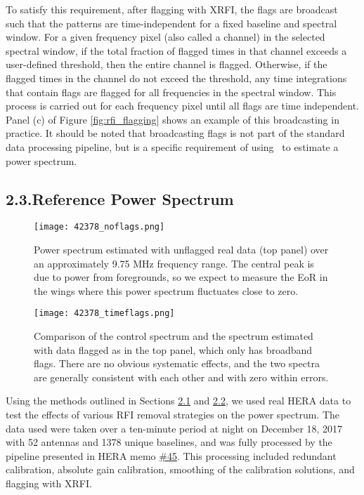 \documentclass[12pt]{article}
\begin{document}
To satisfy this requirement, after flagging with XRFI, the flags are broadcast such that the patterns are time-independent for a fixed baseline and spectral window. For a given frequency pixel (also called a channel) in the selected spectral window, if the total fraction of flagged times in that channel exceeds a user-defined threshold, then the entire channel is flagged. Otherwise, if the flagged times in the channel do not exceed the threshold, any time integrations that contain flags are flagged for all frequencies in the spectral window. This process is carried out for each frequency pixel until all flags are time independent. Panel (c) of Figure \ref{fig:rfi_flagging} shows an example of this broadcasting in practice. It should be noted that broadcasting flags is not part of the standard data processing pipeline, but is a specific requirement of using \herapspec~to estimate a power spectrum. \vspace{3mm}

\tocless\subsection{\hypertarget{subsec:refpspec}{2.3.\hspace{0.75em}Reference Power Spectrum}}

\begin{figure}[p]
	\centering
	\texttt{[image: 42378\_noflags.png]}
	\caption[Original power spectrum]{Power spectrum estimated with unflagged real data (top panel) over an approximately 9.75 MHz frequency range. The central peak is due to power from foregrounds, so we expect to measure the EoR in the wings where this power spectrum fluctuates close to zero.}
	\label{fig:noflags}
\end{figure}

\begin{figure}[p]
	\centering
	\texttt{[image: 42378\_timeflags.png]}
	\caption[Power spectrum calculated with data flagged only in time]{Comparison of the control spectrum and the spectrum estimated with data flagged as in the top panel, which only has broadband flags. There are no obvious systematic effects, and the two spectra are generally consistent with each other and with zero within errors.}
	\label{fig:time_flags}
\end{figure}

Using the methods outlined in Sections \hyperlink{subsec:h1crfi}{2.1} and \hyperlink{subsec:pspecestimation}{2.2}, we used real HERA data to test the effects of various RFI removal strategies on the power spectrum. The data used were taken over a ten-minute period at night on December 18, 2017 with 52 antennas and 1378 unique baselines, and was fully processed by the pipeline presented in HERA memo \href{http://reionization.org/wp-content/uploads/2018/07/IDR2.1_Memo_v2.html}{\#45}. This processing included redundant calibration, absolute gain calibration, smoothing of the calibration solutions, and flagging with XRFI.
\end{document}
